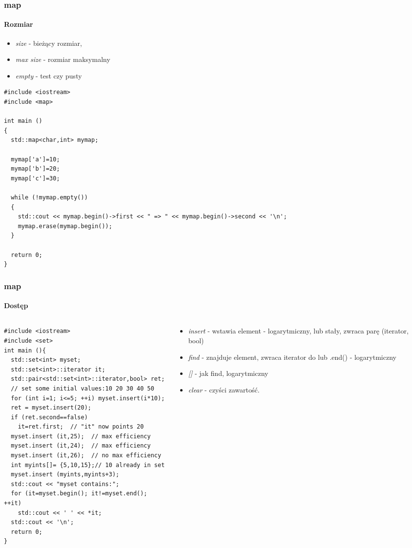 \documentclass[10pt]{beamer}
\begin{document}
\begin{frame}[fragile]
  \frametitle{map}
  \framesubtitle{Rozmiar}
  \begin{itemize} 
    \item \textit{size} - bieżący rozmiar,
    \item \textit{max size} - rozmiar maksymalny
    \item \textit{empty} - test czy pusty
  \end{itemize}
  \begin{lstlisting}
#include <iostream>
#include <map>

int main ()
{
  std::map<char,int> mymap;

  mymap['a']=10;
  mymap['b']=20;
  mymap['c']=30;

  while (!mymap.empty())
  {
    std::cout << mymap.begin()->first << " => " << mymap.begin()->second << '\n';
    mymap.erase(mymap.begin());
  }

  return 0;
}
\end{lstlisting}
\end{frame}

\begin{frame}[fragile]
  \frametitle{map}
  \framesubtitle{Dostęp}
  \begin{columns}
    \begin{column}{0.7\textwidth}
\begin{lstlisting}
#include <iostream>
#include <set>
int main (){
  std::set<int> myset;
  std::set<int>::iterator it;
  std::pair<std::set<int>::iterator,bool> ret;
  // set some initial values:10 20 30 40 50
  for (int i=1; i<=5; ++i) myset.insert(i*10);
  ret = myset.insert(20);
  if (ret.second==false)
    it=ret.first;  // "it" now points 20
  myset.insert (it,25);  // max efficiency
  myset.insert (it,24);  // max efficiency
  myset.insert (it,26);  // no max efficiency
  int myints[]= {5,10,15};// 10 already in set
  myset.insert (myints,myints+3);
  std::cout << "myset contains:";
  for (it=myset.begin(); it!=myset.end(); ++it)
    std::cout << ' ' << *it;
  std::cout << '\n';
  return 0;
}
\end{lstlisting}
    \end{column}
    \begin{column}{0.4\textwidth}
  \begin{itemize}
    \item \textit{insert} - wstawia element - logarytmiczny, lub stały, zwraca parę (iterator, bool)
    \item \textit{find} - znajduje element, zwraca iterator do lub .end() - logarytmiczny
    \item \textit{[]} - jak find, logarytmiczny
    \item \textit{clear} - czyści zawartość.
  \end{itemize}
    \end{column}
  \end{columns}

\end{frame}
\end{document}
